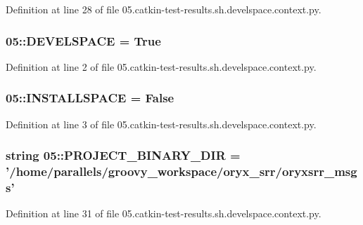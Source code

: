 \-Definition at line 28 of file 05.\-catkin-\/test-\/results.\-sh.\-develspace.\-context.\-py.

\subsubsection[{\-D\-E\-V\-E\-L\-S\-P\-A\-C\-E}]{\setlength{\rightskip}{0pt plus 5cm}05\-::{\bf \-D\-E\-V\-E\-L\-S\-P\-A\-C\-E} = \-True}\label{namespace05_aa1539ccdacdc12c237a7eb245b338dbb}


\-Definition at line 2 of file 05.\-catkin-\/test-\/results.\-sh.\-develspace.\-context.\-py.

\subsubsection[{\-I\-N\-S\-T\-A\-L\-L\-S\-P\-A\-C\-E}]{\setlength{\rightskip}{0pt plus 5cm}05\-::{\bf \-I\-N\-S\-T\-A\-L\-L\-S\-P\-A\-C\-E} = \-False}\label{namespace05_af59f8eaff3efa39540011feb5adfd63b}


\-Definition at line 3 of file 05.\-catkin-\/test-\/results.\-sh.\-develspace.\-context.\-py.

\subsubsection[{\-P\-R\-O\-J\-E\-C\-T\-\_\-\-B\-I\-N\-A\-R\-Y\-\_\-\-D\-I\-R}]{\setlength{\rightskip}{0pt plus 5cm}string 05\-::{\bf \-P\-R\-O\-J\-E\-C\-T\-\_\-\-B\-I\-N\-A\-R\-Y\-\_\-\-D\-I\-R} = '/home/parallels/groovy\-\_\-workspace/oryx\-\_\-srr/oryxsrr\-\_\-msgs'}\label{namespace05_a7993dd17a228b0235dc59716a466be4b}


\-Definition at line 31 of file 05.\-catkin-\/test-\/results.\-sh.\-develspace.\-context.\-py.

